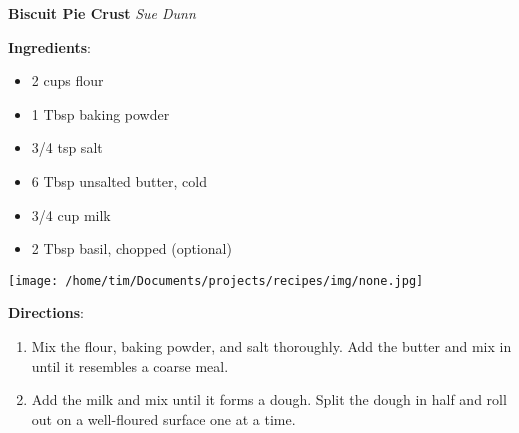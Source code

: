 \documentclass[11pt, twoside, openany]{book}
\begin{document}
\noindent\begin{minipage}[t]{\linewidth}%
{\Large\textbf{Biscuit Pie Crust}} \label{biscuit-pie-crust}\hfill\textit{Sue Dunn}\\
\noindent\begin{minipage}[t]{0.78\linewidth}%
\textbf{Ingredients}:\vspace{-3mm}
\begin{multicols}{2}
\begin{itemize}\setlength\itemsep{-1mm}
\item 2 cups flour
\item 1 Tbsp baking powder
\item 3/4 tsp salt
\item 6 Tbsp unsalted butter, cold
\item 3/4 cup milk
\item 2 Tbsp basil, chopped (optional)
\end{itemize}
\end{multicols}
\end{minipage}
\noindent\begin{minipage}[t]{0.18\linewidth}
\centering \strut\vspace*{-\baselineskip}\newline
\texttt{[image: /home/tim/Documents/projects/recipes/img/none.jpg]}\\
\end{minipage}\vspace{3mm}
\textbf{Directions}:
\vspace{-3mm}\begin{enumerate}\setlength\itemsep{-1mm}
\item Mix the flour, baking powder, and salt thoroughly. Add the butter and mix in until it resembles a coarse meal.
\item Add the milk and mix until it forms a dough. Split the dough in half and roll out on a well-floured surface one at a time.
\end{enumerate}
\end{minipage}\vspace{8mm}
\end{document}
